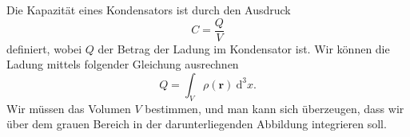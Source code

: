 \documentclass[A4paper, 12pt]{amsart}
\begin{document}
Die Kapazität eines Kondensators ist durch den Ausdruck
%
\begin{equation*}
  C = \frac{Q}{V}
\end{equation*}
%
definiert, wobei $ Q $ der Betrag der Ladung im Kondensator ist.
Wir können die Ladung mittels folgender Gleichung ausrechnen
%
\begin{equation*}
  Q =
  \int_{V}
    \rho (\mathbf{r})
  \ \mathrm{d}^{3}x
  .
\end{equation*}
%
Wir müssen das Volumen $ V $ bestimmen, und man kann sich überzeugen,
dass wir über dem grauen Bereich in der darunterliegenden Abbildung
integrieren soll.
\begin{center}
\end{center}
\end{document}
